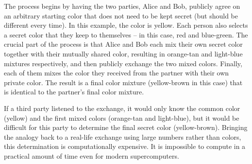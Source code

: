The process begins by having the two parties, Alice and Bob, publicly agree on an arbitrary starting color that does not need to be kept secret (but should be different every time).
In this example, the color is yellow.
Each person also selects a secret color that they keep to themselves – in this case, red and blue-green.
The crucial part of the process is that Alice and Bob each mix their own secret color together with their mutually shared color, resulting in orange-tan and light-blue mixtures respectively, and then publicly exchange the two mixed colors.
Finally, each of them mixes the color they received from the partner with their own private color.
The result is a final color mixture (yellow-brown in this case) that is identical to the partner's final color mixture.

If a third party listened to the exchange, it would only know the common color (yellow) and the first mixed colors (orange-tan and light-blue),
but it would be difficult for this party to determine the final secret color (yellow-brown).
Bringing the analogy back to a real-life exchange using large numbers rather than colors, this determination is computationally expensive.
It is impossible to compute in a practical amount of time even for modern supercomputers.

